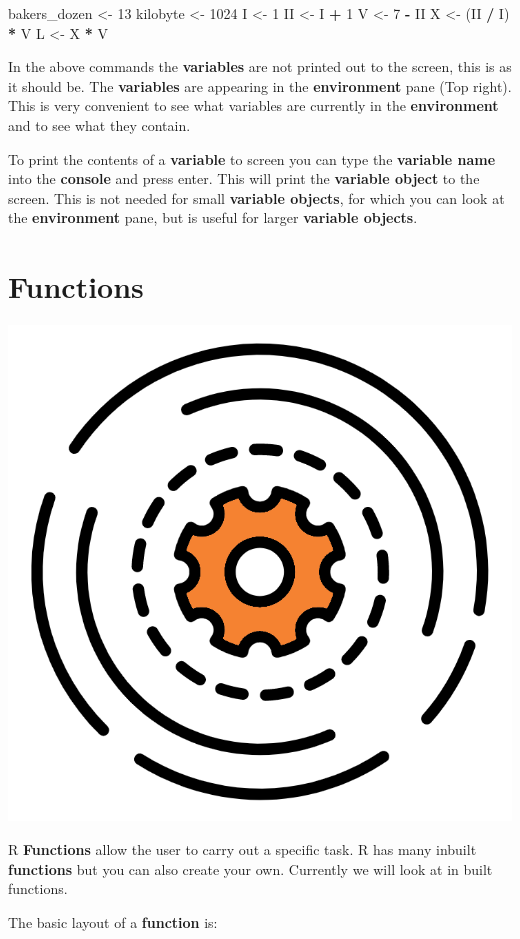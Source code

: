 \documentclass[]{book}
\newenvironment{Shaded}{\begin{snugshade}}{\end{snugshade}}
\newcommand{\DecValTok}[1]{\textcolor[rgb]{0.00,0.00,0.81}{#1}}
\newcommand{\StringTok}[1]{\textcolor[rgb]{0.31,0.60,0.02}{#1}}
\newcommand{\OperatorTok}[1]{\textcolor[rgb]{0.81,0.36,0.00}{\textbf{#1}}}
\newcommand{\NormalTok}[1]{#1}
\begin{document}
\begin{Shaded}
\begin{Highlighting}[]
\NormalTok{bakers_dozen <-}\StringTok{ }\DecValTok{13}
\NormalTok{kilobyte <-}\StringTok{ }\DecValTok{1024}
\NormalTok{I <-}\StringTok{ }\DecValTok{1}
\NormalTok{II <-}\StringTok{ }\NormalTok{I }\OperatorTok{+}\StringTok{ }\DecValTok{1}
\NormalTok{V <-}\StringTok{ }\DecValTok{7} \OperatorTok{-}\StringTok{ }\NormalTok{II}
\NormalTok{X <-}\StringTok{ }\NormalTok{(II }\OperatorTok{/}\StringTok{ }\NormalTok{I) }\OperatorTok{*}\StringTok{ }\NormalTok{V}
\NormalTok{L <-}\StringTok{ }\NormalTok{X }\OperatorTok{*}\StringTok{ }\NormalTok{V}
\end{Highlighting}
\end{Shaded}

In the above commands the \textbf{variables} are not printed out to the
screen, this is as it should be. The \textbf{variables} are appearing in
the \textbf{environment} pane (Top right). This is very convenient to
see what variables are currently in the \textbf{environment} and to see
what they contain.

To print the contents of a \textbf{variable} to screen you can type the
\textbf{variable name} into the \textbf{console} and press enter. This
will print the \textbf{variable object} to the screen. This is not
needed for small \textbf{variable objects}, for which you can look at
the \textbf{environment} pane, but is useful for larger \textbf{variable
objects}.

\section{Functions}\label{functions}

\begin{center}\includegraphics[width=0.2\linewidth]{figures/function} \end{center}

R \textbf{Functions} allow the user to carry out a specific task. R has
many inbuilt \textbf{functions} but you can also create your own.
Currently we will look at in built functions.

The basic layout of a \textbf{function} is:
\end{document}
